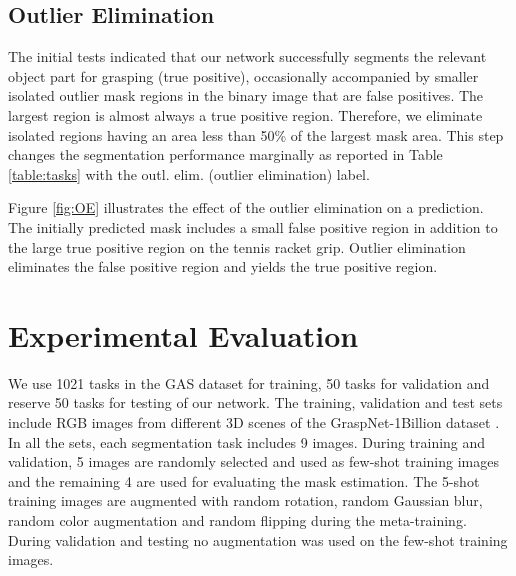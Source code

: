 \documentclass[letterpaper]{article} %
\begin{document}
\subsection{Outlier Elimination}
The initial tests indicated that our network successfully segments the relevant object part for grasping (true positive), occasionally accompanied by smaller isolated outlier mask regions in the binary image that are false positives. The largest region is almost always a true positive region. Therefore, we eliminate isolated regions having an area less than 50\% of the largest mask area. This step changes the segmentation performance marginally as reported in Table \ref{table:tasks} with the outl. elim. (outlier elimination) label. 

Figure \ref{fig:OE} illustrates the effect of the outlier elimination on a prediction. The initially predicted mask includes a small false positive region in addition to the large true positive region on the tennis racket grip. Outlier elimination eliminates the false positive region and yields the true positive region.

\section{Experimental Evaluation}
\label{sec:experiment}

We use 1021 tasks in the GAS dataset for training, 50 tasks for validation and reserve 50 tasks for testing of our network. The training, validation and test sets include RGB images from different 3D scenes of the GraspNet-1Billion dataset \cite{fang2020graspnet}. In all the sets, each segmentation task includes 9 images. During training and validation, 5 images are randomly selected and used as few-shot training images and the remaining 4 are used for evaluating the mask estimation. The 5-shot training images are augmented with random rotation, random Gaussian blur, random color augmentation and random flipping during the meta-training. During validation and testing no augmentation was used on the few-shot training images.
\end{document}
